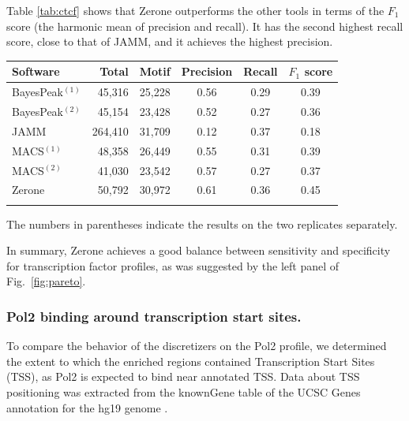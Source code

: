 \documentclass{bioinfo}
\begin{document}
Table \ref{tab:ctcf} shows that Zerone outperforms the other tools
in terms of the $F_1$ score (the harmonic mean of precision and
recall). It has the second highest recall score, close to that of JAMM,
and it achieves the highest precision.

\begin{table}[!t]
{\begin{tabular}{lrrccc}
        \toprule
        \textbf{Software}  & \textbf{Total}  & \textbf{Motif} &
        \textbf{Precision} & \textbf{Recall} & \textbf{$F_{1}$ score} \\
        \midrule
        BayesPeak$^{(1)}$ &  45,316 & 25,228 & 0.56 & 0.29 & 0.39 \\
        BayesPeak$^{(2)}$ &  45,154 & 23,428 & 0.52 & 0.27 & 0.36 \\
        JAMM              & 264,410 & 31,709 & 0.12 & 0.37 & 0.18 \\
        MACS$^{(1)}$      &  48,358 & 26,449 & 0.55 & 0.31 & 0.39 \\
        MACS$^{(2)}$      &  41,030 & 23,542 & 0.57 & 0.27 & 0.37 \\
        Zerone            &  50,792 & 30,972 & 0.61 & 0.36 & 0.45 \\
        \botrule
\end{tabular}}{The numbers in parentheses indicate the results on the two
replicates separately.}
\end{table}

In summary, Zerone achieves a good balance between sensitivity and
specificity for transcription factor profiles, as was suggested by
the left panel of Fig.~\ref{fig:pareto}.

\subsubsection{Pol2 binding around transcription start sites.}
To compare the behavior of the discretizers on the Pol2 profile,
we determined the extent to which the enriched regions contained
Transcription Start Sites (TSS), as Pol2 is expected to bind near
annotated TSS. Data about TSS positioning was extracted from the
knownGene table of the UCSC Genes annotation for the hg19 genome
\citep{Karolchik2004}.
\end{document}
